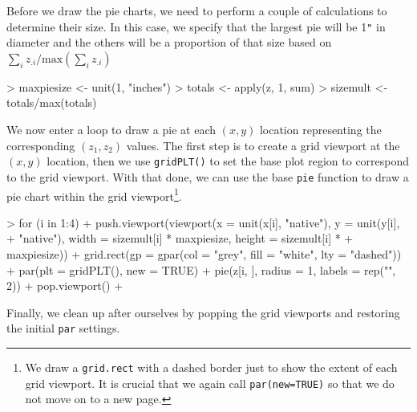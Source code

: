 \documentclass[a4paper]{article}
\begin{document}
\begin{Schunk}
\end{Schunk}
Before we draw the pie charts, we need to perform a couple of
calculations to determine their size.  In this case, we specify that
the largest pie will be 1\verb|"| in diameter and the others will be 
a proportion of that size based on $\sum_i{z_{.i}} /
{}\left( \sum_i{z_{.i}} \right)$

\begin{Schunk}
\begin{Sinput}
> maxpiesize <- unit(1, "inches")
> totals <- apply(z, 1, sum)
> sizemult <- totals/max(totals)
\end{Sinput}
\end{Schunk}
We now enter a loop to draw a pie at each $(x, y)$ location
representing the corresponding $(z_1, z_2)$ values.  The first
step is to create a grid viewport at the $(x, y)$ location,
then we use \verb|gridPLT()|
to set the base plot region to correspond to the grid viewport.
With that done, we can use the base \verb|pie| function to draw a pie
chart within the grid viewport\footnote{We draw a {\tt grid.rect} 
with a dashed border just to show the extent of each grid viewport.
It is crucial that we again call {\tt par(new=TRUE)} so that
we do not move on to a new page.}.  

\begin{Schunk}
\begin{Sinput}
> for (i in 1:4) {
+     push.viewport(viewport(x = unit(x[i], "native"), y = unit(y[i], 
+         "native"), width = sizemult[i] * maxpiesize, height = sizemult[i] * 
+         maxpiesize))
+     grid.rect(gp = gpar(col = "grey", fill = "white", lty = "dashed"))
+     par(plt = gridPLT(), new = TRUE)
+     pie(z[i, ], radius = 1, labels = rep("", 2))
+     pop.viewport()
+ }
\end{Sinput}
\end{Schunk}
Finally, we clean up after ourselves by popping the grid viewports
and restoring the initial \verb|par| settings.
\end{document}
